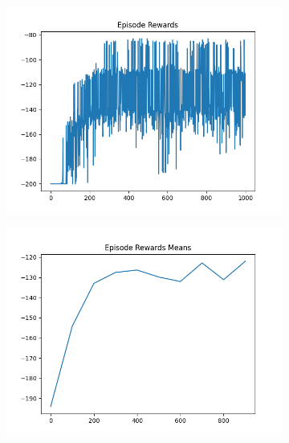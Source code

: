 \begin{figure}[H]
    \centering
    \begin{subfigure}{.47\linewidth}
        \centering
        \includegraphics[width=\textwidth]{mountain/2024-06-15_12-23-27_dqn_mountaincar_episode_rewards.png}
    \end{subfigure}
    \begin{subfigure}{.47\linewidth}
        \centering
        \includegraphics[width=\textwidth]{mountain/2024-06-15_12-23-27_dqn_mountaincar_episode_rewards_means.png}
    \end{subfigure}
    \begin{subfigure}{.47\linewidth}
        \centering

\end{subfigure}
\end{figure}
